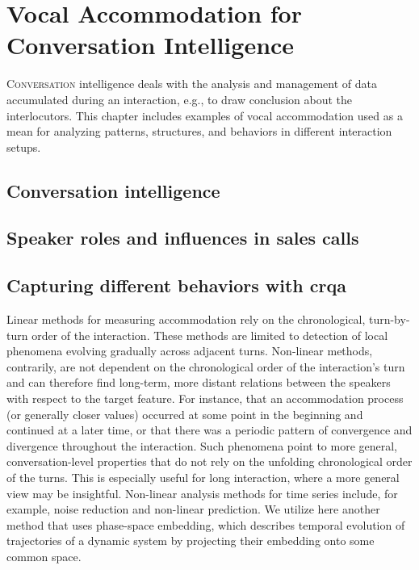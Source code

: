 \chapter{Vocal Accommodation for Conversation Intelligence}
\label{chap:conv_analysis}

\lettrine{C}{onversation} intelligence deals with the analysis and management of data accumulated during an interaction, e.g., to draw conclusion about the interlocutors.
This chapter includes examples of vocal accommodation used as a mean for analyzing patterns, structures, and behaviors in different interaction setups.

\pagebreak

\section{Conversation intelligence}
\label{sec:conversation_intelligence}


\citet{Glaser2016conversational}
\citet{SilberVarod2018human}

\section{Speaker roles and influences in sales calls}
\label{sec:speaker_roles_and_influences_in_sales_calls}

\section{Capturing different behaviors with \acs{crqa}}
\label{sec:capturing_behaviors}

Linear methods for measuring accommodation rely on the chronological, turn-by-turn order of the interaction.
These methods are limited to detection of local phenomena evolving gradually across adjacent turns.
Non-linear methods, contrarily, are not dependent on the chronological order of the interaction's turn and can therefore find long-term, more distant relations between the speakers with respect to the target feature.
For instance, that an accommodation process (or generally closer values) occurred at some point in the beginning and continued at a later time, or that there was a periodic pattern of convergence and divergence throughout the interaction.
Such phenomena point to more general, conversation-level properties that do not rely on the unfolding chronological order of the turns.
This is especially useful for long interaction, where a more general view may be insightful.
Non-linear analysis methods for time series include, for example, noise reduction and non-linear prediction.
We utilize here another method that uses phase-space embedding, which describes temporal evolution of trajectories of a dynamic system by projecting their embedding onto some common space.

